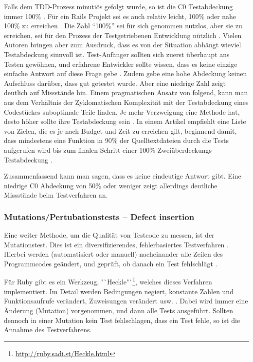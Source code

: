 Falls dem TDD-Prozess minutiös gefolgt wurde, so ist die C0 Testabdeckung immer 100\% \citep{beck_test_2002}. Für ein Rails Projekt sei es auch relativ leicht, 100\% oder nahe 100\% zu erreichen \citep{rappin_rails_2011}. Die Zahl "`100\%"' sei für sich genommen nutzlos, aber sie zu erreichen, sei für den Prozess der Testgetriebenen Entwicklung nützlich \citep[S. 270]{rappin_rails_2011}. Vielen Autoren bringen aber zum Ausdruck, dass es von der Situation abhängt \citep{infoq_2007} wieviel Testabdeckung sinnvoll ist. Test-Anfänger sollten sich zuerst überhaupt ans Testen gewöhnen, und erfahrene Entwickler sollte wissen, dass es keine einzige einfache Antwort auf diese Frage gebe \citep{infoq_2007}. Zudem gebe eine hohe Abdeckung keinen Aufschluss darüber, dass gut getestet wurde. Aber eine niedrige Zahl zeigt deutlich auf Missstände hin. Einem pragmatischen Ansatz von \citeauthor{alberto_savoia_code_2007} folgend, kann man aus dem Verhältnis der Zyklomatischen Komplexität mit der Testabdeckung eines Codestückes suboptimale Teile finden. Je mehr Verzweigung eine Methode hat, desto höher sollte ihre Testabdeckung sein \citep{alberto_savoia_code_2007}. In einem Artikel empfiehlt \citeauthor*{steve_cornett_code_1996} eine Liste von Zielen, die es je nach Budget und Zeit zu erreichen gilt, beginnend damit, dass mindestens eine Funktion in 90\% der Quelltextdateien durch die Tests aufgerufen wird bis zum finalen Schritt einer 100\% Zweiüberdeckungs-Testabdeckung \citep{steve_cornett_code_1996}.
 
 Zusammenfassend kann man sagen, dass es keine eindeutige Antwort gibt. Eine niedrige C0 Abdeckung von 50\% oder weniger zeigt allerdings deutliche Missstände beim Testverfahren an.
 
 \subsubsection{Mutations/Pertubationstests -- Defect insertion}
 \label{sec:mutation}
 Eine weiter Methode, um die Qualität von Testcode zu messen, ist der Mutationstest. Dies ist ein diversifizierendes, fehlerbasiertes Testverfahren \citep{liggesmeyer_modultest_1990}. Hierbei werden (automatisiert oder manuell) nacheinander alle Zeilen des Programmcodes geändert, und geprüft, ob danach ein Test fehlschlägt \citep{beck_test_2002}.
 
 Für Ruby gibt es ein Werkzeug, "`Heckle"`\footnote{\url{http://ruby.sadi.st/Heckle.html}}, welches dieses Verfahren implementiert. Im Detail werden Bedingungen negiert, konstante Zahlen und Funktionsaufrufe verändert, Zuweisungen verändert usw. \citep{ruby_sadists_confessions_2010}. Dabei wird immer eine Änderung (Mutation) vorgenommen, und dann alle Tests ausgeführt. Sollten dennoch in einer Mutation kein Test fehlschlagen, dass ein Test fehle, so ist die Annahme des Testverfahrens.
 
